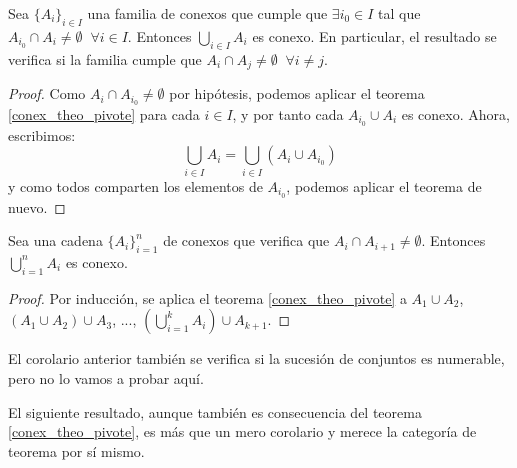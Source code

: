 \begin{cor}
	\label{conex_cor_pivote_corte_comun}
	Sea $\{A_i\}_{i\in I}$ una familia de conexos que cumple que $\exists i_0\in I$ tal que $A_{i_0}\cap A_i\neq\emptyset\;\;\forall i\in I$. Entonces $\bigcup_{i\in I} A_i$ es conexo. En particular, el resultado se verifica si la familia cumple que $A_i\cap A_j\neq\emptyset\;\;\forall i\neq j$.
	
	\begin{proof}
		Como $A_i\cap A_{i_0}\neq\emptyset$ por hipótesis, podemos aplicar el teorema \ref{conex_theo_pivote} para cada $i\in I$, y por tanto cada $A_{i_0}\cup A_i$ es conexo. Ahora, escribimos:
		\[\bigcup_{i\in I} A_i = \bigcup_{i\in I} (A_i\cup A_{i_0})\]
		y como todos comparten los elementos de $A_{i_0}$, podemos aplicar el teorema de nuevo.
	\end{proof}
\end{cor}

\begin{cor}
	Sea una cadena $\{A_i\}_{i=1}^n$ de conexos que verifica que $A_i\cap A_{i+1}\neq\emptyset$. Entonces $\bigcup_{i=1}^n A_i$ es conexo.
	
	\begin{proof}
		Por inducción, se aplica el teorema \ref{conex_theo_pivote} a $A_1\cup A_2$, $(A_1\cup A_2)\cup A_3$, ..., $\left(\bigcup_{i=1}^k A_i\right)\cup A_{k+1}$.
	\end{proof}
\end{cor}

\begin{obs}
	El corolario anterior también se verifica si la sucesión de conjuntos es numerable, pero no lo vamos a probar aquí.
\end{obs}

El siguiente resultado, aunque también es consecuencia del teorema \ref{conex_theo_pivote}, es más que un mero corolario y merece la categoría de teorema por sí mismo.

